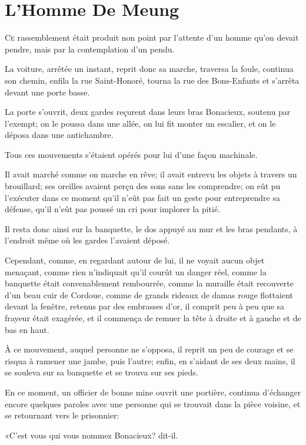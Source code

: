 
\chapter{L'Homme De Meung}

\lettrine{C}{e} rassemblement était produit non point par l'attente d'un homme qu'on devait pendre, mais par la contemplation d'un pendu. 

\zz
La voiture, arrêtée un instant, reprit donc sa marche, traversa la foule, continua son chemin, enfila la rue Saint-Honoré, tourna la rue des Bons-Enfants et s'arrêta devant une porte basse. 

La porte s'ouvrit, deux gardes reçurent dans leurs bras Bonacieux, soutenu par l'exempt; on le poussa dans une allée, on lui fit monter un escalier, et on le déposa dans une antichambre. 

Tous ces mouvements s'étaient opérés pour lui d'une façon machinale. 

Il avait marché comme on marche en rêve; il avait entrevu les objets à travers un brouillard; ses oreilles avaient perçu des sons sans les comprendre; on eût pu l'exécuter dans ce moment qu'il n'eût pas fait un geste pour entreprendre sa défense, qu'il n'eût pas poussé un cri pour implorer la pitié. 

Il resta donc ainsi sur la banquette, le dos appuyé au mur et les bras pendants, à l'endroit même où les gardes l'avaient déposé. 

Cependant, comme, en regardant autour de lui, il ne voyait aucun objet menaçant, comme rien n'indiquait qu'il courût un danger réel, comme la banquette était convenablement rembourrée, comme la muraille était recouverte d'un beau cuir de Cordoue, comme de grands rideaux de damas rouge flottaient devant la fenêtre, retenus par des embrasses d'or, il comprit peu à peu que sa frayeur était exagérée, et il commença de remuer la tête à droite et à gauche et de bas en haut. 

À ce mouvement, auquel personne ne s'opposa, il reprit un peu de courage et se risqua à ramener une jambe, puis l'autre; enfin, en s'aidant de ses deux mains, il se souleva sur sa banquette et se trouva sur ses pieds. 

En ce moment, un officier de bonne mine ouvrit une portière, continua d'échanger encore quelques paroles avec une personne qui se trouvait dans la pièce voisine, et se retournant vers le prisonnier: 

«C'est vous qui vous nommez Bonacieux? dit-il. 


